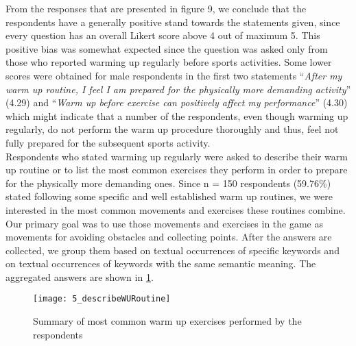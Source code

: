 From the responses that are presented in figure 9, we conclude that the respondents have a generally positive stand towards the statements given, since every question has an overall Likert score above 4 out of maximum 5. This positive bias was somewhat expected since the question was asked only from those who reported warming up regularly before sports activities. Some lower scores were obtained for male respondents in the first two statements ``\textit{After my warm up routine, I feel I am prepared for the physically more demanding activity}'' (4.29) and ``\textit{Warm up before exercise can positively affect my performance}'' (4.30) which might indicate that a number of the respondents, even though warming up regularly, do not perform the warm up procedure thoroughly and thus, feel not fully prepared for the subsequent sports activity.\\ Respondents who stated warming up regularly were asked to describe their warm up routine or to list the most common exercises they perform in order to prepare for the physically more demanding ones.  Since  n = 150 respondents (59.76\%) stated following some specific and well established warm up routines, we were interested in the most common movements and exercises these routines combine. Our primary goal was to use those movements and exercises in the game as movements for avoiding obstacles and collecting points. After the answers are collected, we group them based on textual occurrences of specific keywords and on textual occurrences of keywords with the same semantic meaning. The aggregated answers are shown in \ref{fig:5_describeWURoutine}.
\begin{figure}[h]
    \centering
    \texttt{[image: 5\_describeWURoutine]}
    \caption{Summary of most common warm up exercises performed by the respondents}
    \label{fig:5_describeWURoutine}
\end{figure}\\
